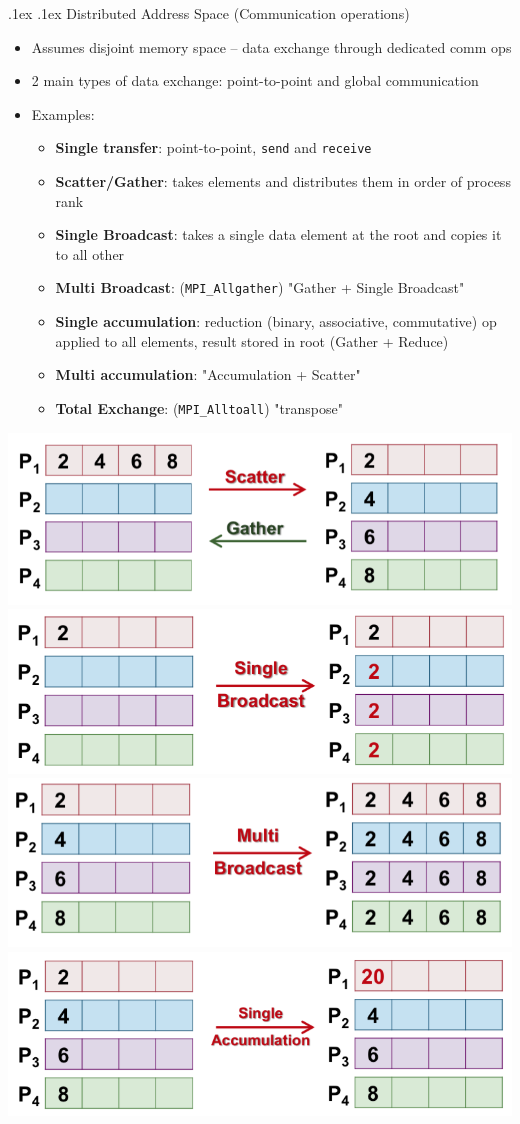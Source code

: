 \documentclass[10pt,landscape,a4paper]{article}
\makeatletter
\renewcommand{\subsubsection}{\@startsection{subsubsection}{1}{0mm}%
  {.1ex}%
  {.1ex}%
{\rmfamily\bfseries}}
\makeatother
\begin{document}
\begin{multicols*}{4}
  \subsubsection{Distributed Address Space (Communication operations)}
  \begin{itemize}
    \item Assumes disjoint memory space -- data exchange through dedicated comm ops
    \item 2 main types of data exchange: point-to-point and global communication
    \item Examples:
    \begin{itemize}
      \item \textbf{Single transfer}: point-to-point, \texttt{send} and \texttt{receive}
      \item \textbf{Scatter/Gather}: takes elements and distributes them in order of process rank
      \item \textbf{Single Broadcast}: takes a single data element at the root and copies it to all other
      \item \textbf{Multi Broadcast}: (\texttt{MPI\_Allgather}) "Gather + Single Broadcast"
      \item \textbf{Single accumulation}: reduction (binary, associative, commutative) op applied to all elements, result stored in root (Gather + Reduce)
      \item \textbf{Multi accumulation}: "Accumulation + Scatter"
      \item \textbf{Total Exchange}: (\texttt{MPI\_Alltoall}) "transpose"
    \end{itemize}
  \end{itemize}
\includegraphics[width=0.33\linewidth]{scattergather}
\includegraphics[width=0.33\linewidth]{singlebcast}
\includegraphics[width=0.33\linewidth]{multibcast}
\includegraphics[width=0.33\linewidth]{singleaccu}

\end{multicols*}
\end{document}
